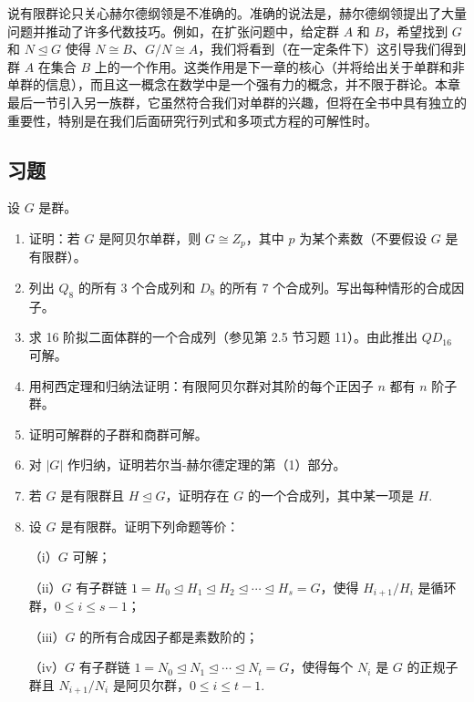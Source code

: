 说有限群论只关心赫尔德纲领是不准确的。准确的说法是，赫尔德纲领提出了大量问题并推动了许多代数技巧。例如，在扩张问题中，给定群 \(A\) 和 \(B\)，希望找到 \(G\) 和 \(N \trianglelefteq G\) 使得 \(N \cong B\)、\(G/N \cong A\)，我们将看到（在一定条件下）这引导我们得到群 \(A\) 在集合 \(B\) 上的一个作用。这类作用是下一章的核心（并将给出关于单群和非单群的信息），而且这一概念在数学中是一个强有力的概念，并不限于群论。本章最后一节引入另一族群，它虽然符合我们对单群的兴趣，但将在全书中具有独立的重要性，特别是在我们后面研究行列式和多项式方程的可解性时。

\subsection*{习题}
设 \(G\) 是群。

\begin{enumerate}
\item 证明：若 \(G\) 是阿贝尔单群，则 \(G \cong Z_p\)，其中 \(p\) 为某个素数（不要假设 \(G\) 是有限群）。

\item 列出 \(Q_8\) 的所有 3 个合成列和 \(D_8\) 的所有 7 个合成列。写出每种情形的合成因子。

\item 求 16 阶拟二面体群的一个合成列（参见第 2.5 节习题 11）。由此推出 \(QD_{16}\) 可解。

\item 用柯西定理和归纳法证明：有限阿贝尔群对其阶的每个正因子 \(n\) 都有 \(n\) 阶子群。

\item 证明可解群的子群和商群可解。

\item 对 \(|G|\) 作归纳，证明若尔当-赫尔德定理的第（1）部分。

\item 若 \(G\) 是有限群且 \(H \trianglelefteq G\)，证明存在 \(G\) 的一个合成列，其中某一项是 \(H\).

\item 设 \(G\) 是有限群。证明下列命题等价：

（i）\(G\) 可解；

（ii）\(G\) 有子群链 \(1 = H_0 \trianglelefteq H_1 \trianglelefteq H_2 \trianglelefteq \cdots \trianglelefteq H_s = G\)，使得 \(H_{i+1}/H_i\) 是循环群，\(0 \leq i \leq s-1\)；

（iii）\(G\) 的所有合成因子都是素数阶的；

（iv）\(G\) 有子群链 \(1 = N_0 \trianglelefteq N_1 \trianglelefteq \cdots \trianglelefteq N_t = G\)，使得每个 \(N_i\) 是 \(G\) 的正规子群且 \(N_{i+1}/N_i\) 是阿贝尔群，\(0 \leq i \leq t-1\).


\end{enumerate}
